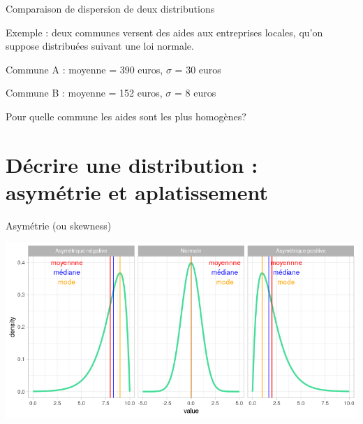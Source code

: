\documentclass{beamer}
\begin{document}
\begin{frame}{Comparaison de dispersion de deux distributions}



Exemple : deux communes  versent des aides aux entreprises locales, qu'on suppose distribuées suivant une loi normale. 

Commune A :  moyenne = 390 euros, $\sigma$ = 30 euros 

Commune B :  moyenne = 152 euros, $\sigma$ = 8 euros

\vspace{1cm}

Pour quelle commune les aides sont les plus homogènes?



\end{frame}





\section{Décrire une distribution : \alert{asymétrie} et \alert{aplatissement}} 



\begin{frame}{Asymétrie (ou \alert{skewness})}




\centering
\includegraphics[width=\linewidth]{img/asymetrie.png}



\end{frame}
\end{document}
